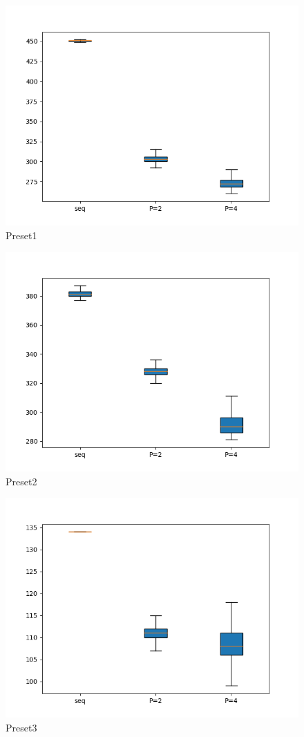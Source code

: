 \documentclass[]{article}
\begin{document}
\begin{figure}
	\centering
	\includegraphics[width=0.7\linewidth]{Preset_1}
	\caption[Preset1]{Preset1}
	\label{fig:preset1}
\end{figure}

\begin{figure}
	\centering
	\includegraphics[width=0.7\linewidth]{Preset_2}
	\caption[Preset1]{Preset2}
	\label{fig:preset2}
\end{figure}

\begin{figure}
	\centering
	\includegraphics[width=0.7\linewidth]{Preset_3}
	\caption[Preset1]{Preset3}
	\label{fig:preset3}
\end{figure}
\end{document}
